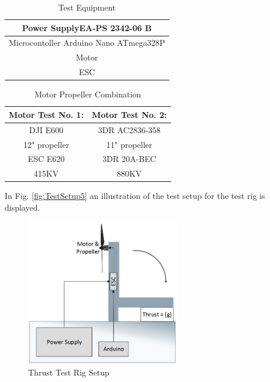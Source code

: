 \begin {table}[H]
    \begin{center}
    \caption {Test Equipment} 
    \label{tab:tab6} 
    \begin{tabular}{|c|}\hline 
        Power SupplyEA-PS 2342-06 B           \\ \hline
        Microcontoller Arduino Nano ATmega328P \\ \hline
        Motor \\ \hline
        ESC\\ \hline    
        \end{tabular}
    \end{center}
\end{table}

\begin {table}[H]
    \begin{center}
    \caption {Motor Propeller Combination} 
    \label{tab:tab7} 
    \begin{tabular}{|c|c|}\hline 
        Motor Test No. 1: & Motor Test No. 2:    \\ \hline
        DJI E600 & 3DR AC2836-358   \\ \hline
        12" propeller & 11" propeller \\ \hline
        ESC E620 & 3DR 20A-BEC\\ \hline
        415KV & 880KV\\ \hline
        \end{tabular}
    \end{center}
\end{table}
In Fig. \ref{fig:TestSetup5} an illustration of the test setup for the test rig is displayed.
\begin{figure}[H]
    \centering
    \includegraphics[width = 0.6\textwidth]{VAPIQ-PICTURES/TestSetup5}
    \caption{Thrust Test Rig Setup}
    \label{fig:onemotor}
\end{figure}


